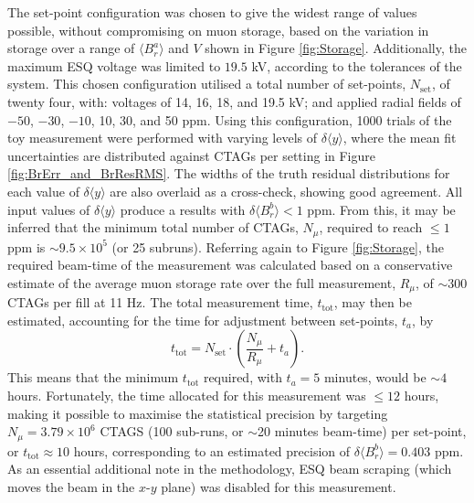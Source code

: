 The set-point configuration was chosen to give the widest range of values possible, without compromising on muon storage, based on the variation in storage over a range of $\langle B_{r}^{a} \rangle$ and $V$ shown in Figure \ref{fig:Storage}. Additionally, the maximum ESQ voltage was limited to $19.5$ kV, according to the tolerances of the system. This chosen configuration utilised a total number of set-points, $N_{\text{set}}$, of twenty four, with: voltages of 14, 16, 18, and 19.5 kV; and applied radial fields of $-50$, $-30$, $-10$, 10, 30, and 50 ppm. Using this configuration, 1000 trials of the toy measurement were performed with varying levels of $\delta \langle y \rangle$, where the mean fit uncertainties are distributed against CTAGs per setting in Figure \ref{fig:BrErr_and_BrResRMS}. The widths of the truth residual distributions for each value of $\delta \langle y \rangle$ are also overlaid as a cross-check, showing good agreement. All input values of $\delta \langle y \rangle$ produce a results with $\delta \langle B_{r}^{b} \rangle < 1$ ppm. From this, it may be inferred that the minimum total number of CTAGs, $N_{\mu}$, required to reach $\leq1$ ppm is $\sim9.5\times10^{5}$ (or 25 subruns). Referring again to Figure \ref{fig:Storage}, the required beam-time of the measurement was calculated based on a conservative estimate of the average muon storage rate over the full measurement, $R_{\mu}$, of $\sim$300 CTAGs per fill at 11 Hz. The total measurement time, $t_{\text{tot}}$, may then be estimated, accounting for the time for adjustment between set-points, $t_{a}$, by 
%
\begin{equation}
  t_{\text{tot}} = N_{\text{set}}\cdot\left(\frac{N_{\mu}}{R_{\mu}} + t_{a}\right). %
  \label{eqn:BrTiming}
\end{equation}
%
This means that the minimum $t_{\text{tot}}$ required, with $t_{a}=5$ minutes, would be $\sim4$ hours. Fortunately, the time allocated for this measurement was $\leq12$ hours, making it possible to maximise the statistical precision by targeting $N_{\mu}=3.79\times10^{6}$ CTAGS (100 sub-runs, or $\sim$20 minutes beam-time) per set-point, or $t_{\text{tot}}\approx10$ hours, corresponding to an estimated precision of $\delta \langle B_{r}^{b} \rangle = 0.403$ ppm. As an essential additional note in the methodology, ESQ beam scraping (which moves the beam in the $x$-$y$ plane) was disabled for this measurement.

